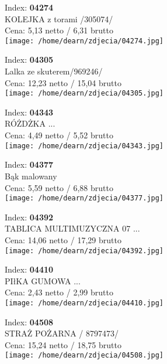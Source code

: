 {Index: \textbf{04274}\\
KOLEJKA z torami /305074/\\
Cena: 5,13 netto / 6,31 brutto\\
  \texttt{[image: /home/dearn/zdjecia/04274.jpg]}}\newline\newline

{Index: \textbf{04305}\\
Lalka ze skuterem/969246/\\
Cena: 12,23 netto / 15,04 brutto\\
  \texttt{[image: /home/dearn/zdjecia/04305.jpg]}}\newline\newline

{Index: \textbf{04343}\\
RÓŻDŻKA                   ...\\
Cena: 4,49 netto / 5,52 brutto\\
  \texttt{[image: /home/dearn/zdjecia/04343.jpg]}}\newline\newline

{Index: \textbf{04377}\\
Bąk malowany\\
Cena: 5,59 netto / 6,88 brutto\\
  \texttt{[image: /home/dearn/zdjecia/04377.jpg]}}\newline\newline

{Index: \textbf{04392}\\
TABLICA MULTIMUZYCZNA  07 ...\\
Cena: 14,06 netto / 17,29 brutto\\
  \texttt{[image: /home/dearn/zdjecia/04392.jpg]}}\newline\newline

{Index: \textbf{04410}\\
PIłKA GUMOWA              ...\\
Cena: 2,43 netto / 2,99 brutto\\
  \texttt{[image: /home/dearn/zdjecia/04410.jpg]}}\newline\newline

{Index: \textbf{04508}\\
STRAŻ POŻARNA  / 8797473/\\
Cena: 15,24 netto / 18,75 brutto\\
  \texttt{[image: /home/dearn/zdjecia/04508.jpg]}}\newline\newline

